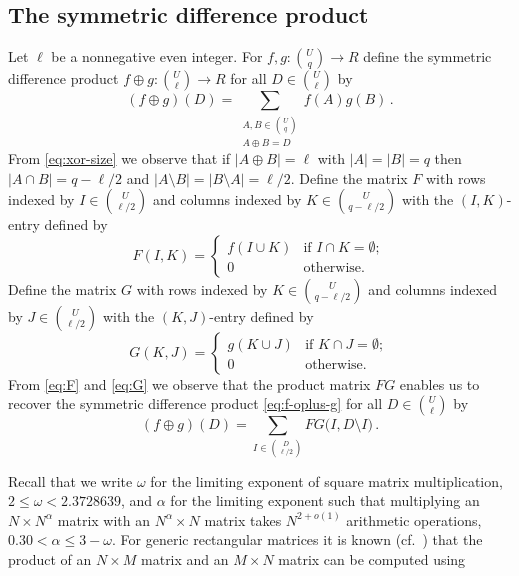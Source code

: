 \documentclass{amsart}
\begin{document}
\subsection{The symmetric difference product}
\label{sect:sdp}

Let $\ell$ be a nonnegative even integer. For $f,g:\binom{U}{q}\rightarrow R$
define the symmetric difference product 
$f\oplus g:\binom{U}{\ell}\rightarrow R$ for all $D\in\binom{U}{\ell}$
by
\begin{equation}
\label{eq:f-oplus-g}
(f\oplus g)(D)=
\!\!\sum_{\substack{A,B\in\binom{U}{q}\\A\oplus B=D}}\!\!f(A)g(B)\,.
\end{equation}
From \eqref{eq:xor-size} we observe that if $|A\oplus B|=\ell$ 
with $|A|=|B|=q$ then $|A\cap B|=q-\ell/2$ and 
$|A\setminus B|=|B\setminus A|=\ell/2$. Define the matrix
$F$ with rows indexed by $I\in\binom{U}{\ell/2}$ and
columns indexed by $K\in\binom{U}{q-\ell/2}$ with
the $(I,K)$-entry defined by
\begin{equation}
\label{eq:F}
F(I,K)=
\begin{cases}
f(I\cup K) & \text{if $I\cap K=\emptyset$};\\
0          & \text{otherwise}.
\end{cases}
\end{equation}
Define the matrix
$G$ with rows indexed by $K\in\binom{U}{q-\ell/2}$
and columns indexed by $J\in\binom{U}{\ell/2}$ with
the $(K,J)$-entry defined by
\begin{equation}
\label{eq:G}
G(K,J)=
\begin{cases}
g(K\cup J) & \text{if $K\cap J=\emptyset$};\\
0          & \text{otherwise}.
\end{cases}
\end{equation}
From \eqref{eq:F} and \eqref{eq:G}
we observe that the product matrix $FG$ enables us to recover
the symmetric difference product \eqref{eq:f-oplus-g} for all 
$D\in\binom{U}{\ell}$ by 
\begin{equation}
\label{eq:from-fg}
(f\oplus g)(D)=\sum_{I\in\binom{D}{\ell/2}}FG\bigl(I,D\setminus I\bigr)\,.
\end{equation}

Recall that we write $\omega$ for the limiting exponent of square matrix 
multiplication, $2\leq \omega<2.3728639$, and $\alpha$ for the limiting exponent such that multiplying an $N\times N^\alpha$ matrix with an $N^\alpha\times N$ matrix takes $N^{2+o(1)}$ arithmetic operations, $0.30<\alpha\leq 3-\omega$.
For generic rectangular matrices it is known (cf.~\cite{LR83}) that the product of 
an $N\times M$ matrix and an $M\times N$ matrix can be computed using
\end{document}
